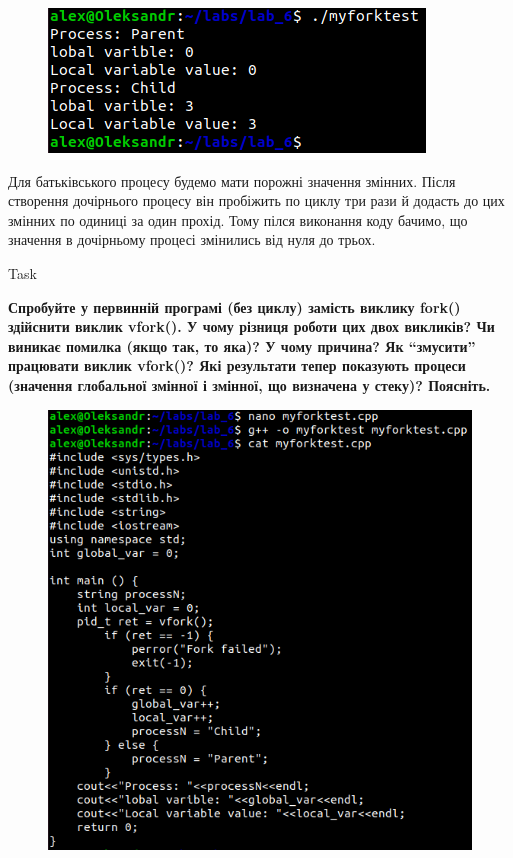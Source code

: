 \documentclass[a4paper,12pt]{article}
\newcommand{\RomanNumeralCaps}[1]{\MakeUppercase{\romannumeral #1}}
\begin{document}
\newpage
    \begin{figure}[h!]
        \begin{minipage}[h]{1\linewidth}
            \centering
            \includegraphics[width=0.6\linewidth]{Prt sc/Figure_5_2.png}  
        \end{minipage}
    \end{figure}
    Для батьківського процесу будемо мати порожні значення змінних. Після створення дочірнього процесу він пробіжить по циклу три рази й додасть до цих змінних по одиниці за один прохід.
    Тому пілся виконання коду бачимо, що значення в дочірньому процесі змінились від нуля до трьох.
    \begin{center}
        \Large{Task \RomanNumeralCaps{6}}
    \end{center}
    \textbf{Спробуйте у первинній програмі (без циклу) замість виклику fork() здійснити виклик vfork(). У чому різниця
    роботи цих двох викликів? Чи виникає помилка (якщо так, то яка)? У чому причина? Як “змусити” працювати виклик
    vfork()? Які результати тепер показують процеси (значення глобальної змінної і змінної, що визначена у стеку)? Поясніть.}
    \begin{figure}[h!]
        \begin{minipage}[h]{1\linewidth}
            \centering
            \includegraphics[width=0.6\linewidth]{Prt sc/Figure_6_1.png}  
        \end{minipage}
    \end{figure}
\end{document}
